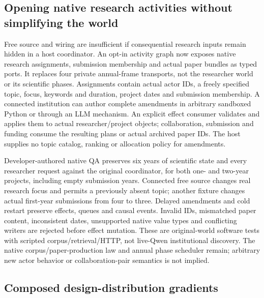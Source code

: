 \subsection{Opening native research activities without simplifying the world}
\label{sec:native-activities-v6}

Free source and wiring are insufficient if consequential research inputs remain
hidden in a host coordinator. An opt-in activity graph now exposes native
research assignments, submission membership and actual paper bundles as typed
ports. It replaces four private annual-frame transports, not the researcher
world or its scientific phases. Assignments contain actual actor IDs, a freely
specified topic, focus, keywords and duration, project dates and submission
membership. A connected institution can author complete amendments in arbitrary
sandboxed Python or through an LLM mechanism. An explicit effect consumer
validates and applies them to actual researcher/project objects; collaboration,
submission and funding consume the resulting plans or actual archived paper IDs.
The host supplies no topic catalog, ranking or allocation policy for amendments.

Developer-authored native QA preserves six years of scientific state and every
researcher request against the original coordinator, for both one- and two-year
projects, including empty submission years. Connected free source changes real
research focus and permits a previously absent topic; another fixture changes
actual first-year submissions from four to three. Delayed amendments and cold
restart preserve effects, queues and causal events. Invalid IDs, mismatched
paper content, inconsistent dates, unsupported native value types and conflicting
writers are rejected before effect mutation. These are original-world software
tests with scripted corpus/retrieval/HTTP, not live-Qwen institutional discovery.
The native corpus/paper-production law and annual phase scheduler remain;
arbitrary new actor behavior or collaboration-pair semantics is not implied.

\subsection{Composed design-distribution gradients}
\label{sec:factorized-gradient-v6}

